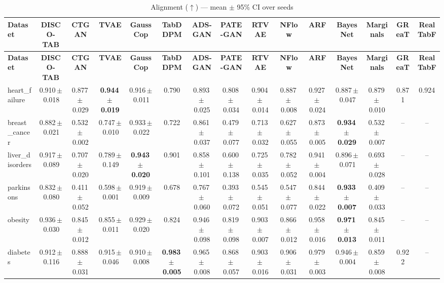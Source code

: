 \documentclass[8pt]{extarticle}
\begin{document}
\begin{longtable}{l*{14}{c}}
\caption{Alignment ($\uparrow$) --- mean $\pm$ 95\% CI over seeds}\\
\toprule
\textbf{Dataset} & \textbf{DISCO-TAB} & \textbf{CTGAN} & \textbf{TVAE} & \textbf{GaussCop} & \textbf{TabDDPM} & \textbf{ADS-GAN} & \textbf{PATE-GAN} & \textbf{RTVAE} & \textbf{NFlow} & \textbf{ARF} & \textbf{BayesNet} & \textbf{Marginals} & \textbf{GReaT} & \textbf{RealTabF} \\
\midrule
\endfirsthead
\toprule
\textbf{Dataset} & \textbf{DISCO-TAB} & \textbf{CTGAN} & \textbf{TVAE} & \textbf{GaussCop} & \textbf{TabDDPM} & \textbf{ADS-GAN} & \textbf{PATE-GAN} & \textbf{RTVAE} & \textbf{NFlow} & \textbf{ARF} & \textbf{BayesNet} & \textbf{Marginals} & \textbf{GReaT} & \textbf{RealTabF} \\
\midrule
\endhead
\bottomrule
\endfoot
heart\_failure & 0.910\,$\pm$\,0.018 & 0.877\,$\pm$\,0.029 & \textbf{0.944\,$\pm$\,0.019} & 0.916\,$\pm$\,0.011 & 0.790 & 0.893\,$\pm$\,0.025 & 0.808\,$\pm$\,0.034 & 0.904\,$\pm$\,0.014 & 0.887\,$\pm$\,0.008 & 0.927\,$\pm$\,0.024 & 0.887\,$\pm$\,0.047 & 0.879\,$\pm$\,0.010 & 0.871 & 0.924 \\
breast\_cancer & 0.882\,$\pm$\,0.021 & 0.532\,$\pm$\,0.002 & 0.747\,$\pm$\,0.010 & 0.933\,$\pm$\,0.022 & 0.722 & 0.861\,$\pm$\,0.037 & 0.479\,$\pm$\,0.077 & 0.713\,$\pm$\,0.032 & 0.627\,$\pm$\,0.055 & 0.873\,$\pm$\,0.005 & \textbf{0.934\,$\pm$\,0.029} & 0.532\,$\pm$\,0.007 & -- & -- \\
liver\_disorders & 0.917\,$\pm$\,0.089 & 0.707\,$\pm$\,0.020 & 0.789\,$\pm$\,0.149 & \textbf{0.943\,$\pm$\,0.020} & 0.901 & 0.858\,$\pm$\,0.101 & 0.600\,$\pm$\,0.138 & 0.725\,$\pm$\,0.035 & 0.782\,$\pm$\,0.052 & 0.941\,$\pm$\,0.004 & 0.896\,$\pm$\,0.071 & 0.693\,$\pm$\,0.028 & -- & -- \\
parkinsons & 0.832\,$\pm$\,0.080 & 0.411\,$\pm$\,0.052 & 0.598\,$\pm$\,0.001 & 0.919\,$\pm$\,0.009 & 0.678 & 0.767\,$\pm$\,0.060 & 0.393\,$\pm$\,0.072 & 0.545\,$\pm$\,0.051 & 0.547\,$\pm$\,0.077 & 0.844\,$\pm$\,0.022 & \textbf{0.933\,$\pm$\,0.007} & 0.409\,$\pm$\,0.033 & -- & -- \\
obesity & 0.936\,$\pm$\,0.030 & 0.845\,$\pm$\,0.012 & 0.855\,$\pm$\,0.011 & 0.929\,$\pm$\,0.020 & 0.824 & 0.946\,$\pm$\,0.098 & 0.819\,$\pm$\,0.098 & 0.903\,$\pm$\,0.007 & 0.866\,$\pm$\,0.012 & 0.958\,$\pm$\,0.016 & \textbf{0.971\,$\pm$\,0.013} & 0.845\,$\pm$\,0.011 & -- & -- \\
diabetes & 0.912\,$\pm$\,0.116 & 0.888\,$\pm$\,0.031 & 0.915\,$\pm$\,0.046 & 0.910\,$\pm$\,0.008 & \textbf{0.983\,$\pm$\,0.005} & 0.965\,$\pm$\,0.008 & 0.868\,$\pm$\,0.057 & 0.903\,$\pm$\,0.016 & 0.906\,$\pm$\,0.031 & 0.979\,$\pm$\,0.003 & 0.946\,$\pm$\,0.004 & 0.859\,$\pm$\,0.008 & 0.922 & -- \\

\end{longtable}
\end{document}

